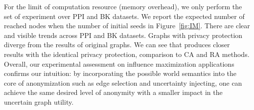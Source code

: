 For the limit of computation resource (memory overhead), we only perform the set of experiment over PPI and BK datasets. We report the expected number of reached nodes when the number of initial seeds in Figure~\ref{fig:IM}. 
There are clear and visible trends across PPI and BK datasets. 
Graphs with privacy protection diverge from the results of original graphs.
We can see that {\methodName} produces closer results with the identical privacy protection, comparison to CA and RA methods. 
Overall, our experimental assessment on influence maximization applications confirms our intuition: by incorporating the possible world semantics into the core of anonymization such as edge selection and uncertainty injecting, one can achieve the same desired level of anonymity with a smaller impact in the uncertain graph utility.  